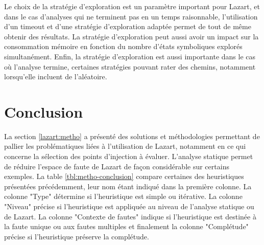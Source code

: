             Le choix de la stratégie d'exploration est un paramètre important pour Lazart, et dans le cas d'analyses qui ne terminent pas en un temps raisonnable, l'utilisation d'un timeout et d'une stratégie d'exploration adaptée permet de tout de même obtenir des résultats. 
            La stratégie d'exploration peut aussi avoir un impact sur la consommation mémoire en fonction du nombre d'états symboliques explorés simultanément.
            Enfin, la stratégie d'exploration est aussi importante dans le cas où l'analyse termine, certaines stratégies pouvant rater des chemins, notamment lorsqu'elle incluent de l'aléatoire.
            
    \section{Conclusion}
        \label{sec:lazart:metho:concl}
        
        La section \ref{lazart:metho} a présenté des solutions et méthodologies permettant de pallier les problématiques liées à l'utilisation de Lazart, notamment en ce qui concerne la sélection des points d'injection à évaluer.
        L'analyse statique permet de réduire l'espace de faute de Lazart de façon considérable sur certains exemples.
        La table \ref{tbl:metho-conclusion} compare certaines des heuristiques présentées précédemment, leur nom étant indiqué dans la première colonne.
        La colonne "Type" détermine si l'heuristique est simple ou itérative. La colonne "Niveau" précise si l'heuristique est appliquée au niveau de l'analyse statique ou de Lazart.
        La colonne "Contexte de fautes" indique si l'heuristique est destinée à la faute unique ou aux fautes multiples et finalement la colonne "Complétude" précise si l'heuristique préserve la complétude.
        

